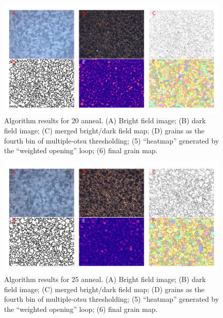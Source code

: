 \documentclass[12pt, titlepage]{article}
\begin{document}
	\begin{figure}[h]
		\centering
		\includegraphics[width=1.0\linewidth]{microstructure_20C.png}
		\caption{Algorithm results for 20  anneal. (A) Bright field image; (B) dark field image; (C) merged bright/dark field map; (D) grains as the fourth bin of multiple-otsu thresholding; (5) ``heatmap'' generated by the ``weighted opening'' loop; (6) final grain map.}
		\label{fig:micro_20C}
	\end{figure}

	\begin{figure}[h]
		\centering
		\includegraphics[width=1.0\linewidth]{microstructure_25C.png}
		\caption{Algorithm results for 25  anneal. (A) Bright field image; (B) dark field image; (C) merged bright/dark field map; (D) grains as the fourth bin of multiple-otsu thresholding; (5) ``heatmap'' generated by the ``weighted opening'' loop; (6) final grain map.}
		\label{fig:micro_25C}
	\end{figure}
\end{document}
